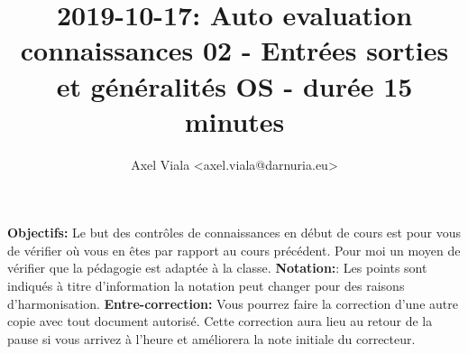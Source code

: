 \documentclass[11pt,a4paper,addpoint,answers]{exam}
\author{Axel Viala <axel.viala@darnuria.eu>}
\title{2019-10-17: Auto evaluation connaissances 02 - Entrées sorties et généralités OS - durée 15 minutes}
\begin{document}
  \maketitle
  \textbf{Objectifs:} Le but des contrôles de connaissances en début de cours est pour vous de vérifier où vous
  en êtes par rapport au cours précédent.
  \newline
  Pour moi un moyen de vérifier que la pédagogie est adaptée à la classe.
  \newline
  \textbf{Notation:}: Les points sont indiqués à titre d'information la notation peut changer pour
  des raisons d'harmonisation.
  \newline
  \textbf{Entre-correction:} Vous pourrez faire la correction d'une autre copie avec tout document
  autorisé. Cette correction aura lieu au retour de la pause si vous arrivez à l'heure et
  améliorera la note initiale du correcteur.
\end{document}

